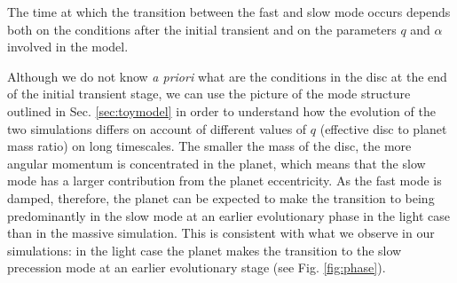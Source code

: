 \documentclass[usenatbib,a4paper,times,fleqn]{mnras}
\begin{document}
The time at which the transition between the fast and slow mode occurs depends both on the conditions after the initial transient and on the parameters $q$ and $\alpha$ involved in the model.

Although we do not know {\it a priori} what are the conditions in the disc at the end of the initial transient stage, we can use the picture
of the mode structure outlined in Sec. \ref{sec:toymodel} in order to understand how the evolution of the two simulations differs on account of different values of $q$ (effective disc to planet mass ratio) on long timescales. The smaller the mass of the disc, the more angular momentum is concentrated in the planet, which means that the slow mode has a larger contribution from the planet eccentricity. As the fast mode is damped, therefore, the planet can be expected to make the transition to being predominantly in the slow mode at an earlier evolutionary phase in the light case than in the massive simulation. This is consistent with what we observe in our simulations:
in the light case the planet makes the transition to the slow precession mode at an earlier evolutionary stage (see Fig. \ref{fig:phase}).
\end{document}
